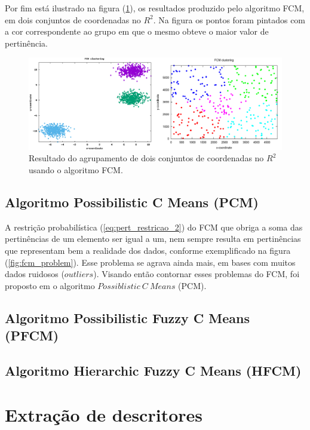 Por fim está ilustrado na figura (\ref{fig:samples_fcm}), os resultados produzido pelo algoritmo FCM,
em dois conjuntos de coordenadas no $R^2$. Na figura os pontos foram pintados com a cor 
correspondente ao grupo em que o mesmo obteve o maior valor de pertinência.

\begin{figure}[!htp]
  \centering
  \includegraphics[width=0.8\columnwidth]{assets/samples_fcm.png}
  \caption{Resultado do agrupamento de dois conjuntos de coordenadas no $R^2$ usando o algoritmo 
  FCM\protect\footnotemark.}
  \label{fig:samples_fcm}
\end{figure}

\subsection{Algoritmo Possibilistic C Means (PCM)}

A restrição probabilística (\ref{eq:pert_restricao_2}) do FCM que obriga a soma das pertinências de um elemento ser
igual a um, nem sempre resulta em pertinências que representam bem a realidade dos dados,
conforme exemplificado na figura (\ref{fig:fcm_problem}). 
Esse problema se agrava ainda mais, em bases com muitos dados ruidosos ($outliers$).
Visando então contornar esses problemas do FCM, foi proposto em \cite{Krishnapuram1993} 
o algoritmo $Possiblistic\ C\ Means$ (PCM).


\subsection{Algoritmo Possibilistic Fuzzy C Means (PFCM)}
\subsection{Algoritmo Hierarchic Fuzzy C Means (HFCM)}

\section{Extração de descritores}

